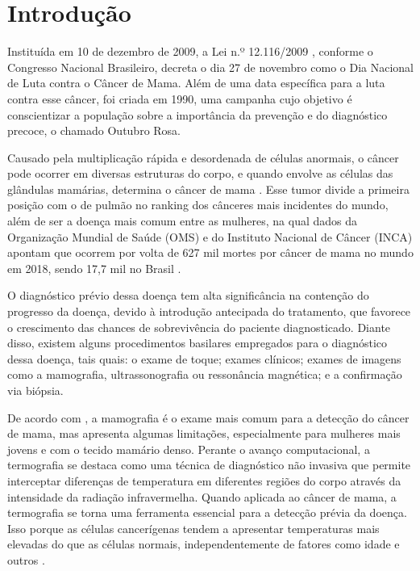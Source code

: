 
\section{\esp Introdução} \label{intro}

Instituída em 10 de dezembro de 2009, a Lei n.º 12.116/2009 , conforme o Congresso Nacional Brasileiro, decreta o dia 27 de novembro como o Dia Nacional de Luta contra o Câncer de Mama. Além de uma data específica para a luta contra esse câncer, foi criada em 1990, uma campanha cujo objetivo é conscientizar a população sobre a importância da prevenção e do diagnóstico precoce, o chamado Outubro Rosa.

Causado pela multiplicação rápida e desordenada de células anormais, o câncer pode ocorrer em diversas estruturas do corpo, e quando envolve as células das glândulas mamárias, determina o câncer de mama \cite{incaoquee}. Esse tumor divide a primeira posição com o de pulmão no ranking dos cânceres mais incidentes do mundo, além de ser a doença mais comum entre as mulheres, na qual dados da Organização Mundial de Saúde (OMS) e do Instituto Nacional de Câncer (INCA) apontam que ocorrem por volta de 627 mil mortes por câncer de mama no mundo em 2018, sendo 17,7 mil no Brasil \cite{boletimepidemiologico}.

O diagnóstico prévio dessa doença tem alta significância na contenção do progresso da doença, devido à introdução antecipada do tratamento, que favorece o crescimento das chances de sobrevivência do paciente diagnosticado. Diante disso, existem alguns procedimentos basilares empregados para o diagnóstico dessa doença, tais quais: o exame de toque; exames clínicos; exames de imagens como a mamografia, ultrassonografia ou ressonância magnética; e a confirmação via biópsia.

De acordo com , a mamografia é o exame mais comum para a detecção do câncer de mama, mas apresenta algumas limitações, especialmente para mulheres mais jovens e com o tecido mamário denso. Perante o avanço computacional, a termografia se destaca como uma técnica de diagnóstico não invasiva que permite interceptar diferenças de temperatura em diferentes regiões do corpo através da intensidade da radiação infravermelha. Quando aplicada ao câncer de mama, a termografia se torna uma ferramenta essencial para a detecção prévia da doença. Isso porque as células cancerígenas tendem a apresentar temperaturas mais elevadas do que as células normais, independentemente de fatores como idade e outros \cite{leles}.

